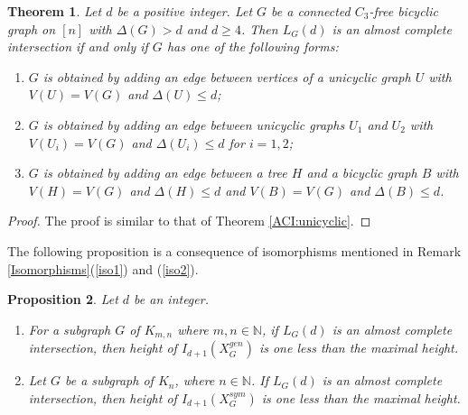 \documentclass[11pt,a4paper,reqno]{amsart}
\newtheorem{thm}{Theorem}[section]
\newtheorem{prop}[thm]{Proposition}
\theoremstyle{definition}
\numberwithin{equation}{section}
\def\NN{\mathbb{N}}
\begin{document}
\begin{thm} \label{ACI:bicyclic}
    Let $d$ be a positive integer. Let $G$ be a connected $C_3$-free  bicyclic graph on $[n]$ with $\Delta(G)>d$ and $d \geq 4$. Then $L_G(d)$ is an almost complete intersection if and only if $G$ has one of the following forms:
    \begin{enumerate}
        \item \label{ACIbia} $G$ is obtained by adding an edge between vertices of a unicyclic graph $U$ with $V(U)=V(G)$ and $\Delta(U) \leq d$;
        \item \label{ACIbib} $G$ is obtained by adding an edge between unicyclic graphs $U_1$ and $U_2$ with $V(U_i)=V(G)$ and $\Delta(U_i) \leq d$ for $i=1,2$;
        \item \label{ACIbic} $G$ is obtained by adding an edge between a tree $H$ and a bicyclic graph $B$ with $V(H)=V(G)$ and $\Delta(H) \leq d$ and $V(B)=V(G)$ and $\Delta(B) \leq d$.
        
    \end{enumerate}
\end{thm}
\begin{proof}
    The proof is similar to that of Theorem \ref{ACI:unicyclic}.
\end{proof}


The following proposition is a consequence of isomorphisms mentioned in Remark \ref{Isomorphisms}(\ref{iso1}) and (\ref{iso2}).

\begin{prop} Let $d$ be an integer.
\begin{enumerate}
    \item For a subgraph $G$ of $K_{m,n}$ where $m,n \in \NN$, if $L_G(d)$ is an almost complete intersection, then height of $I_{d+1}(X_G^{gen})$ is one less than the maximal height.
    
    \item Let $G$ be a subgraph of $K_{n}$, where $n \in \NN $. If $L_G(d)$ is an almost complete intersection, then height of $I_{d+1}(X_G^{sym})$ is one less than the maximal height.
\end{enumerate}
\end{prop}

\end{document}
